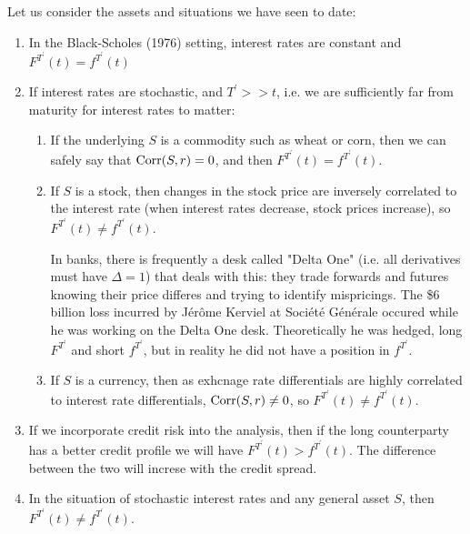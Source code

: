 \documentclass[11pt]{article}
\begin{document}
Let us consider the assets and situations we have seen to date:
\begin{enumerate}
\item In the Black-Scholes (1976) setting, interest rates are constant and $F^{T^\prime}(t) = f^{T^\prime}(t)$
\item If interest rates are stochastic, and $T^\prime >> t$, i.e. we are sufficiently far from maturity for interest rates to matter:
\begin{enumerate}
\item If the underlying $S$ is a commodity such as wheat or corn, then we can safely say that $\operatorname{\mathrm Corr}(S, r) = 0$, and then $F^{T^\prime}(t) = f^{T^\prime}(t)$.
\item If $S$ is a stock, then changes in the stock price are inversely correlated to the interest rate (when interest rates decrease, stock prices increase), so $F^{T^\prime}(t) \neq f^{T^\prime}(t)$.

\begin{remark}
In banks, there is frequently a desk called "Delta One" (i.e. all derivatives must have $\Delta=1$) that deals with this: they trade forwards and futures knowing their price differes and trying to identify mispricings. The \$6 billion loss incurred by Jérôme Kerviel at Société Générale occured while he was working on the Delta One desk. Theoretically he was hedged, long $F^{T^\prime}$ and short $f^{T^\prime}$, but in reality he did not have a position in $f^{T^\prime}$.
\end{remark}

\item If $S$ is a currency, then as exhcnage rate differentials are highly correlated to interest rate differentials, $\operatorname{\mathrm Corr}(S, r) \neq 0$, so $F^{T^\prime}(t) \neq f^{T^\prime}(t)$.
\end{enumerate}
\item If we incorporate credit risk into the analysis, then if the long counterparty has a better credit profile we will have $F^{T^\prime}(t) > f^{T^\prime}(t)$. The difference between the two will increse with the credit spread.
\item In the situation of stochastic interest rates and any general asset $S$, then $F^{T^\prime}(t) \neq f^{T^\prime}(t)$.
\end{enumerate}
\end{document}
